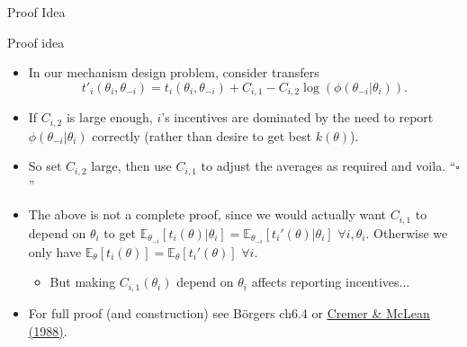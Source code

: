 \documentclass[english,10pt
,aspectratio=169
]{beamer}
\begin{document}
\begin{frame}{Proof Idea}
	\begin{block}{Proof idea}
		\begin{itemize}
			\item In our mechanism design problem, consider transfers
			$$t'_i(\theta_i,\theta_{-i}) = t_i(\theta_i,\theta_{-i}) + C_{i,1} - C_{i,2} \log (\phi(\theta_{-i}|\theta_i)).$$
			\item If $C_{i,2}$ is large enough, $i$'s incentives are dominated by the need to report $\phi(\theta_{-i}|\theta_i)$ correctly (rather than desire to get best $k(\theta)$).
			\item So set $C_{i,2}$ large, then use $C_{i,1}$ to adjust the averages as required and voila. ``$\square $''
		\end{itemize}
	\end{block}
\begin{itemize}
	\item The above is \alert{not a complete proof}, since we would actually want $C_{i,1}$ to depend on $\theta_i$ to get $\mathbb{E}_{\theta_{-i}} \left[ t_i(\theta) | \theta_i \right] = \mathbb{E}_{\theta_{-i}} \left[ t_i'(\theta) | \theta_i \right]$ $\forall i,\theta_i$. Otherwise we only have $\mathbb{E}_{\theta} \left[ t_i(\theta) \right] = \mathbb{E}_{\theta} \left[ t_i'(\theta) \right]$ $\forall i$.
	\begin{itemize}
		\item But making $C_{i,1}(\theta_i)$ depend on $\theta_i$ affects reporting incentives...
	\end{itemize}
	\item For full proof (and construction) see B{\"o}rgers ch6.4 or \href{https://www.jstor.org/stable/1913096}{\uline{Cremer \& McLean (1988)}}.
\end{itemize}
\end{frame}
\end{document}
